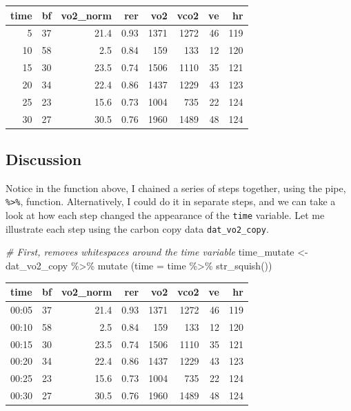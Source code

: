 \documentclass[
]{book}
\newenvironment{Shaded}{\begin{snugshade}}{\end{snugshade}}
\newcommand{\AttributeTok}[1]{\textcolor[rgb]{0.77,0.63,0.00}{#1}}
\newcommand{\CommentTok}[1]{\textcolor[rgb]{0.56,0.35,0.01}{\textit{#1}}}
\newcommand{\FunctionTok}[1]{\textcolor[rgb]{0.00,0.00,0.00}{#1}}
\newcommand{\NormalTok}[1]{#1}
\newcommand{\OtherTok}[1]{\textcolor[rgb]{0.56,0.35,0.01}{#1}}
\newcommand{\SpecialCharTok}[1]{\textcolor[rgb]{0.00,0.00,0.00}{#1}}
\begin{document}
\begin{tabular}{r|r|r|r|r|r|r|r}
\hline
time & bf & vo2\_norm & rer & vo2 & vco2 & ve & hr\\
\hline
5 & 37 & 21.4 & 0.93 & 1371 & 1272 & 46 & 119\\
\hline
10 & 58 & 2.5 & 0.84 & 159 & 133 & 12 & 120\\
\hline
15 & 30 & 23.5 & 0.74 & 1506 & 1110 & 35 & 121\\
\hline
20 & 34 & 22.4 & 0.86 & 1437 & 1229 & 43 & 123\\
\hline
25 & 23 & 15.6 & 0.73 & 1004 & 735 & 22 & 124\\
\hline
30 & 27 & 30.5 & 0.76 & 1960 & 1489 & 48 & 124\\
\hline
\end{tabular}

\hypertarget{discussion}{%
\subsection{Discussion}\label{discussion}}

Notice in the function above, I chained a series of steps together, using the pipe, \texttt{\%\textgreater{}\%}, function. Alternatively, I could do it in separate steps, and we can take a look at how each step changed the appearance of the \texttt{time} variable. Let me illustrate each step using the carbon copy data \texttt{dat\_vo2\_copy}.

\begin{Shaded}
\begin{Highlighting}[]
\CommentTok{\# First, removes whitespaces around the time variable}
\NormalTok{time\_mutate }\OtherTok{\textless{}{-}}\NormalTok{ dat\_vo2\_copy }\SpecialCharTok{\%\textgreater{}\%}
  \FunctionTok{mutate}\NormalTok{ (}\AttributeTok{time =}\NormalTok{ time }\SpecialCharTok{\%\textgreater{}\%} 
                 \FunctionTok{str\_squish}\NormalTok{()) }
\end{Highlighting}
\end{Shaded}

\begin{tabular}{l|r|r|r|r|r|r|r}
\hline
time & bf & vo2\_norm & rer & vo2 & vco2 & ve & hr\\
\hline
00:05 & 37 & 21.4 & 0.93 & 1371 & 1272 & 46 & 119\\
\hline
00:10 & 58 & 2.5 & 0.84 & 159 & 133 & 12 & 120\\
\hline
00:15 & 30 & 23.5 & 0.74 & 1506 & 1110 & 35 & 121\\
\hline
00:20 & 34 & 22.4 & 0.86 & 1437 & 1229 & 43 & 123\\
\hline
00:25 & 23 & 15.6 & 0.73 & 1004 & 735 & 22 & 124\\
\hline
00:30 & 27 & 30.5 & 0.76 & 1960 & 1489 & 48 & 124\\
\hline
\end{tabular}
\end{document}
